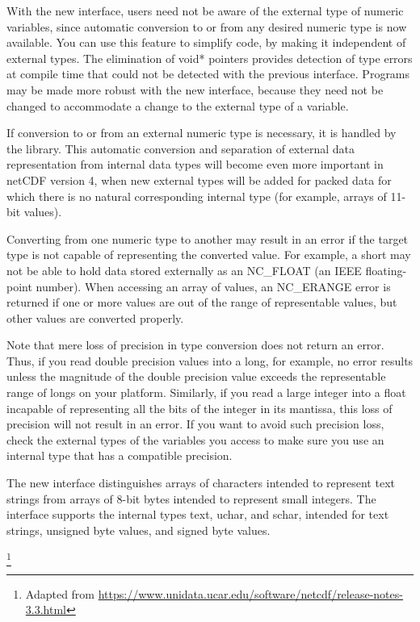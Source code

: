 {\itshape

With the new interface, users need not be aware of the external type of numeric variables, since automatic conversion to or from any desired numeric type is now available.
You can use this feature to simplify code, by making it independent of external types.
The elimination of void* pointers provides detection of type errors at compile time that could not be detected with the previous interface.
Programs may be made more robust with the new interface, because they need not be changed to accommodate a change to the external type of a variable.

If conversion to or from an external numeric type is necessary, it is handled by the library.
This automatic conversion and separation of external data representation from internal data types will become even more important in netCDF version 4, when new external types will be added for packed data for which there is no natural corresponding internal type (for example, arrays of 11-bit values).

Converting from one numeric type to another may result in an error if the target type is not capable of representing the converted value.
For example, a short may not be able to hold data stored externally as an NC\_FLOAT (an IEEE floating-point number).
When accessing an array of values, an NC\_ERANGE error is returned if one or more values are out of the range of representable values, but other values are converted properly.

Note that mere loss of precision in type conversion does not return an error.
Thus, if you read double precision values into a long, for example, no error results unless the magnitude of the double precision value exceeds the representable range of longs on your platform.
Similarly, if you read a large integer into a float incapable of representing all the bits of the integer in its mantissa, this loss of precision will not result in an error.
If you want to avoid such precision loss, check the external types of the variables you access to make sure you use an internal type that has a compatible precision.

The new interface distinguishes arrays of characters intended to represent text strings from arrays of 8-bit bytes intended to represent small integers.
The interface supports the internal types text, uchar, and schar, intended for text strings, unsigned byte values, and signed byte values.
}\footnote{Adapted from \url{https://www.unidata.ucar.edu/software/netcdf/release-notes-3.3.html}}


